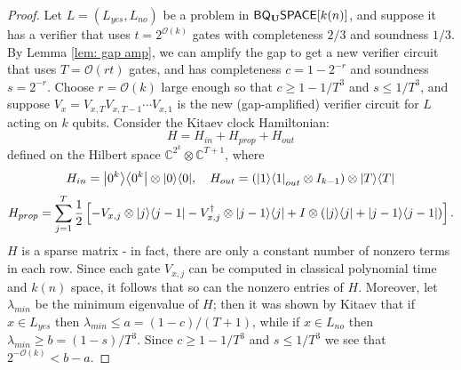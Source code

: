 \documentclass[11pt]{article}
\newtheorem{corollary}[theorem]{Corollary}
\theoremstyle{definition}
\theoremstyle{remark}
\newcommand\BQSPACE{{\sf{BQSPACE}}}
\newcommand\PSPACE{{\sf{PSPACE}}}
\newcommand\preciseQMA{{\sf{PreciseQMA}}}
\newcommand{\classfont}{\sf}
\newcommand{\Unitary}{\mathbf{U}}
\newcommand{\unitaryBQSPACE}[1]{{\classfont{BQ}_\Unitary\classfont{SPACE}}[#1]}
\newcommand\bigoh{\mathcal{O}}
\begin{document}
\begin{proof}
Let $L=(L_{yes},L_{no})$ be a problem in $\unitaryBQSPACE{k(n)}$, and suppose it has a verifier that uses $t=2^{\bigoh(k)}$ gates with completeness $2/3$ and soundness $1/3$. By Lemma \ref{lem: gap amp}, we can   amplify the gap to get a new verifier circuit that uses $T=\mathcal{O}(rt)$ gates, and has completeness $c=1-2^{-r}$ and soundness $s=2^{-r}$. Choose $r=\bigoh(k)$ large enough so that $c \ge 1 - 1/T^3$ and $s \le 1/T^3$, and suppose $V_x=V_{x,T}V_{x,T-1}\cdots V_{x,1}$ is the new (gap-amplified) verifier circuit for $L$ acting on $k$ qubits. Consider the Kitaev clock Hamiltonian:
\begin{equation}
H = H_{in} + H_{prop} + H_{out}
\end{equation}
defined on the Hilbert space $\mathbb{C}^{2^k} \otimes \mathbb{C}^{T+1}$, where
\begin{equation}
H_{in} = {\left\vert{0^k}\right\rangle}{\left\langle{0^k}\right\vert} \otimes {\left\vert{0}\right\rangle}{\left\langle{0}\right\vert}, \quad
H_{out} = ({\left\vert{1}\right\rangle}{\left\langle{1}\right\vert}_{out} \otimes I_{k-1}) \otimes {\left\vert{T}\right\rangle}{\left\langle{T}\right\vert}
\end{equation}
\begin{equation}
H_{prop} = \sum_{j=1}^T \frac{1}{2} \left[ - V_{x,j} \otimes {\left\vert{j}\right\rangle}{\left\langle{j-1}\right\vert} - V_{x,j}^\dagger \otimes {\left\vert{j-1}\right\rangle}{\left\langle{j}\right\vert} + I \otimes ({\left\vert{j}\right\rangle}{\left\langle{j}\right\vert} + {\left\vert{j-1}\right\rangle}{\left\langle{j-1}\right\vert}) \right].
\end{equation}
$H$ is a sparse matrix - in fact, there are only a constant number of nonzero terms in each row. Since each gate $V_{x,j}$ can be computed in classical polynomial time and $k(n)$ space, it follows that so can the nonzero entries of $H$. Moreover, let $\lambda_{min}$ be the minimum eigenvalue of $H$; then it was shown by Kitaev \cite{ksv02} that if $x \in L_{yes}$ then $\lambda_{min} \le a = (1-c)/(T+1)$, while if $x \in L_{no}$ then $\lambda_{min} \ge b = (1-s)/T^3$. Since $c \ge 1-1/T^3$ and $s \le 1/T^3$ we see that $2^{-\mathcal{O}(k)} < b-a$. 
\end{proof}

\end{document}

